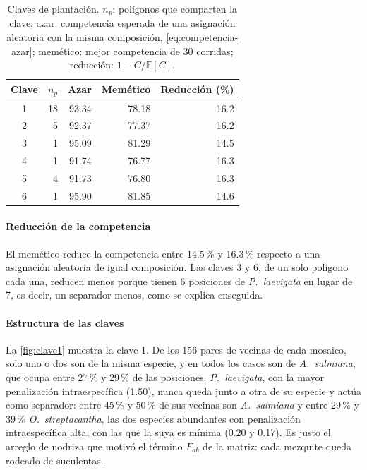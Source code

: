 \begin{table}[t]
\centering
\caption{Claves de plantación. $n_p$: polígonos que comparten la clave; azar: competencia esperada de una asignación aleatoria con la misma composición, \cref{eq:competencia-azar}; memético: mejor competencia de 30 corridas; reducción: $1-C/\mathbb{E}[C]$.}
\label{tab:res-mosaicos}
\small
\begin{tabular}{@{}crrrr@{}}
\toprule
Clave & $n_p$ & Azar & Memético & Reducción (\%) \\
\midrule
1 & 18 & 93.34 & 78.18 & 16.2 \\
2 &  5 & 92.37 & 77.37 & 16.2 \\
3 &  1 & 95.09 & 81.29 & 14.5 \\
4 &  1 & 91.74 & 76.77 & 16.3 \\
5 &  4 & 91.73 & 76.80 & 16.3 \\
6 &  1 & 95.90 & 81.85 & 14.6 \\
\bottomrule
\end{tabular}
\end{table}

\paragraph{Reducción de la competencia} El memético reduce la competencia entre 14.5\,\% y 16.3\,\% respecto a una asignación aleatoria de igual composición. Las claves 3 y 6, de un solo polígono cada una, reducen menos porque tienen 6 posiciones de \textit{P.~laevigata} en lugar de 7, es decir, un separador menos, como se explica enseguida.

\paragraph{Estructura de las claves} La \cref{fig:clave1} muestra la clave 1. De los 156 pares de vecinas de cada mosaico, solo uno o dos son de la misma especie, y en todos los casos son de \textit{A.~salmiana}, que ocupa entre 27\,\% y 29\,\% de las posiciones. \textit{P.~laevigata}, con la mayor penalización intraespecífica (1.50), nunca queda junto a otra de su especie y actúa como separador: entre 45\,\% y 50\,\% de sus vecinas son \textit{A.~salmiana} y entre 29\,\% y 39\,\% \textit{O.~streptacantha}, las dos especies abundantes con penalización intraespecífica alta, con las que la suya es mínima (0.20 y 0.17). Es justo el arreglo de nodriza que motivó el término $F_{ab}$ de la matriz: cada mezquite queda rodeado de suculentas.

